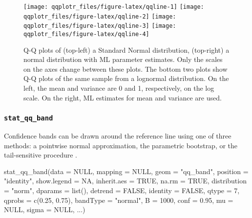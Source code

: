 \begin{Schunk}
\begin{figure}

{\centering \texttt{[image: qqplotr\_files/figure-latex/qqline-1]} \texttt{[image: qqplotr\_files/figure-latex/qqline-2]} \texttt{[image: qqplotr\_files/figure-latex/qqline-3]} \texttt{[image: qqplotr\_files/figure-latex/qqline-4]} 

}

\caption[Q-Q plots of (top-left) a Standard Normal distribution, (top-right) a normal distribution with ML parameter estimates]{Q-Q plots of (top-left) a Standard Normal distribution, (top-right) a normal distribution with ML parameter estimates. Only the scales on the axes change between these plots. The bottom two plots show Q-Q plots of the same sample from a lognormal distribution. On the left, the mean and variance are 0 and 1, respectively, on the log scale. On the right, ML estimates for mean and variance are used.}\label{fig:qqline}
\end{figure}
\end{Schunk}

\subsubsection{\texorpdfstring{\texttt{stat\_qq\_band}}{stat\_qq\_band}}\label{stat_qq_band}

Confidence bands can be drawn around the reference line using one of
three methods: a pointwise normal approximation, the parametric
bootstrap, or the tail-sensitive procedure \citep{Aldor-Noiman2013-xw}.

\begin{Schunk}
\begin{Sinput}
stat_qq_band(data = NULL,
             mapping = NULL,
             geom = "qq_band",
             position = "identity",
             show.legend = NA,
             inherit.aes = TRUE,
             na.rm = TRUE,
             distribution = "norm",
             dparams = list(),
             detrend = FALSE,
             identity = FALSE,
             qtype = 7,
             qprobs = c(0.25, 0.75),
             bandType = "normal",
             B = 1000,
             conf = 0.95,
             mu = NULL,
             sigma = NULL,
             ...)
\end{Sinput}
\end{Schunk}


